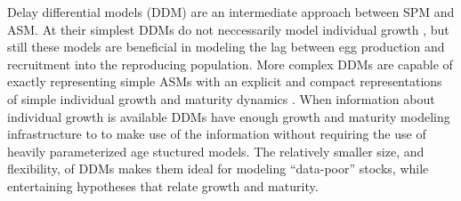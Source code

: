 %
Delay differential models (DDM) are an intermediate approach between SPM and ASM. 
At their simplest DDMs do not neccessarily model individual growth \cite{dick_depletion-based_2011, aalto_separating_2015}, 
but still these models are beneficial in modeling the lag between egg production and recruitment into the reproducing population.  %
More complex DDMs are capable of exactly representing simple ASMs with an explicit and compact
representations of simple individual growth and maturity dynamics \cite{deriso_harvesting_1980, schnute_general_1985, schnute_general_1987}.
When information about individual growth is available DDMs have enough growth and maturity modeling infrastructure to %
to make use of the information without requiring the use of heavily parameterized age stuctured models. %
The relatively smaller size, and flexibility, of DDMs makes them ideal for modeling ``data-poor'' stocks, 
while entertaining hypotheses that relate growth and maturity.  

